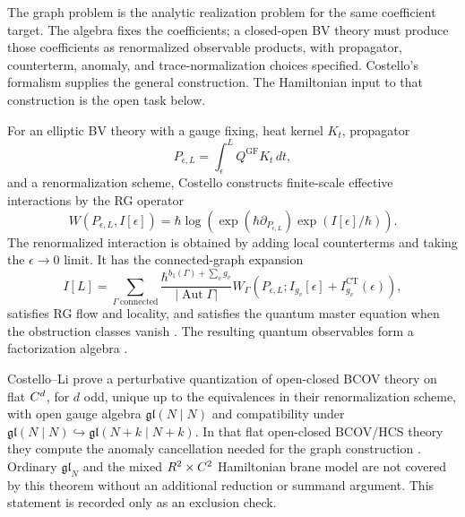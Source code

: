 \documentclass[11pt]{memoir}
\begin{document}
The graph problem is the analytic realization problem for the same
coefficient target. The algebra fixes the coefficients; a closed-open BV
theory must produce those
coefficients as renormalized observable products, with propagator,
counterterm, anomaly, and trace-normalization choices specified.
Costello's formalism supplies the general construction. The Hamiltonian
input to that construction is the open task below.

\begin{stmt}\label{stmt:costello-bv-package}
  For an elliptic BV theory with a gauge fixing, heat kernel $K_t$, propagator
  $$P_{\epsilon,L}=\int_{\epsilon}^{L}Q^{\mathrm{GF}}K_t\,dt,$$
  and a renormalization scheme, Costello constructs finite-scale effective
  interactions by the RG operator
  $$W(P_{\epsilon,L},I[\epsilon])
    =\hbar\log\!\left(\exp(\hbar\partial_{P_{\epsilon,L}})
       \exp(I[\epsilon]/\hbar)\right).$$
  The renormalized interaction is obtained by adding local counterterms and
  taking the $\epsilon\to0$ limit. It has the connected-graph expansion
  $$I[L]=\sum_{\Gamma\ \mathrm{connected}}
    \frac{\hbar^{b_1(\Gamma)+\sum_v g_v}}{|\operatorname{Aut}\Gamma|}
    W_\Gamma(P_{\epsilon,L};I_{g_v}[\epsilon]+I^{\mathrm{CT}}_{g_v}(\epsilon)),$$
  satisfies RG flow and locality, and satisfies the quantum master equation
  when the obstruction classes vanish \cite{costello-renormalization}. The
  resulting quantum observables form a factorization algebra
  \cites{costello-gwilliam,costello-gwilliam-vol2}.
\end{stmt}

\begin{stmt}\label{stmt:costello-li-flat-bcov}
  Costello--Li prove a perturbative quantization of open-closed BCOV
  theory on flat $C^d$, for $d$ odd, unique up to the equivalences in their
  renormalization scheme, with open gauge algebra
  $\mathfrak{gl}(N\mid N)$ and compatibility under
  $\mathfrak{gl}(N\mid N)\hookrightarrow\mathfrak{gl}(N+k\mid N+k)$. In that
  flat open-closed BCOV/HCS theory they compute the anomaly cancellation needed
  for the graph construction \cite{costello-li-open-closed-bcov}. Ordinary
  $\mathfrak{gl}_N$ and the mixed $R^2\times C^2$ Hamiltonian brane model are
  not covered by this theorem without an additional reduction or summand
  argument. This statement is recorded only as an exclusion check.
\end{stmt}
\end{document}
